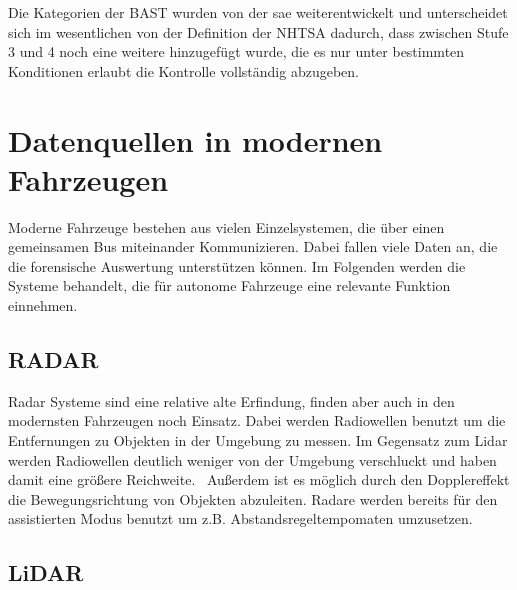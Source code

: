 \documentclass[conference,compsoc,final,a4paper]{IEEEtran}
\begin{document}
Die Kategorien der \ac{BAST} wurden von der \ac{sae} weiterentwickelt \cite{bast2021} und unterscheidet sich im wesentlichen von der Definition der \ac{NHTSA} dadurch, dass zwischen Stufe 3 und 4 noch eine weitere hinzugefügt wurde, die es nur unter bestimmten Konditionen erlaubt die Kontrolle vollständig abzugeben\cite{SAE2021}.

\section{Datenquellen in modernen Fahrzeugen}

Moderne Fahrzeuge bestehen aus vielen Einzelsystemen, die über einen gemeinsamen Bus miteinander Kommunizieren.
Dabei fallen viele Daten an, die die forensische Auswertung unterstützen können. Im Folgenden werden die Systeme behandelt,
die für autonome Fahrzeuge eine relevante Funktion einnehmen.


\subsection{RADAR}

Radar Systeme sind eine relative alte Erfindung, finden aber auch in den modernsten Fahrzeugen noch Einsatz.
Dabei werden Radiowellen benutzt um die Entfernungen zu Objekten in der Umgebung zu messen.
Im Gegensatz zum Lidar werden Radiowellen deutlich weniger von der Umgebung verschluckt und haben damit eine
größere Reichweite.~\cite{Neal2018} Außerdem ist es möglich durch den Dopplereffekt die Bewegungsrichtung von Objekten abzuleiten.
Radare werden bereits für den assistierten Modus benutzt um z.B. Abstandsregeltempomaten umzusetzen.

\subsection{LiDAR}
\end{document}

